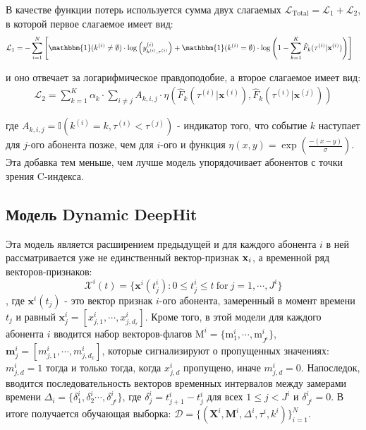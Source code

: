 \documentclass{article}
\begin{document}
В качестве функции потерь используется сумма двух слагаемых $\mathcal{L}_{\mathrm{Total}}=\mathcal{L}_1+\mathcal{L}_2$, в которой первое слагаемое имеет вид: 
\begin{equation}
	\begin{aligned}
		\mathcal{L}_{1} & = -\sum_{i=1}^N \left[\mathbbm{1}(k^{(i)}\neq\emptyset)\cdot\log\left(y_{k^{(i)},\tau^{(i)}}^{(i)}\right)  + \mathbbm{1}(k^{(i)}=\emptyset)\cdot\log\left(1-\sum_{k=1}^K\hat{F}_k(\tau^{(i)}|\mathbf{x}^{(i)})\right)\right]
	\end{aligned}
\end{equation}

и оно отвечает за логарифмическое правдоподобие, а второе слагаемое имеет вид: 
\begin{equation}
	\begin{aligned}
\mathcal{L}_2=\sum_{k=1}^K\alpha_k\cdot\sum_{i\neq j}A_{k,i,j}\cdot\eta\left(\hat{F}_k(\tau^{(i)}|\mathbf{x}^{(i)}),\hat{F}_k(\tau^{(i)}|\mathbf{x}^{(j)})\right)
	\end{aligned}
\end{equation}

где $A_{k,i,j} = \mathbb{I}(k^{(i)}=k,\tau^{(i)}<\tau^{(j)})$ - индикатор того, что событие $k$ наступает для $j$-ого абонента позже, чем для $i$-ого и функция
$\eta(x,y)=\exp\left(\frac{-(x-y)}{\sigma}\right)$. Эта добавка тем меньше, чем лучше модель упорядочивает абонентов с точки зрения C-индекса. 



\subsection{Модель Dynamic DeepHit}

Эта модель является расширением предыдущей и для каждого абонента $i$ в ней рассматривается уже не единственный вектор-признак $\bold{x}_i$, а временной ряд векторов-признаков: 
$$\mathcal{X}^i(t)=\{\mathbf{x}^i(t_j^i):0\leq t_j^i\leq t\mathrm{~for~}j=1,\cdots,J^i\}$$, где $\mathbf{x}^i(t_j)$ - это вектор признак $i$-ого абонента, замеренный в момент времени $t_j$ и равный $\mathbf{x}_j^i=[x_{j,1}^{i},\cdots,x_{j,d_{r}}^{i}]$. Кроме того, в этой модели для каждого абонента $i$ вводится набор векторов-флагов $\mathrm{M}^i=\{\mathrm{m}_1^i,\cdots,\mathrm{m}_{J^i}^i\}$, $\mathbf{m}_j^i=[m_{j,1}^i,\cdots,m_{j,d_x}^i]$, которые сигнализируют о пропущенных значениях: $m_{j,d}^{i}=1$ тогда и только тогда, когда $x_{j,d}^{i}$ пропущено, иначе $m_{j,d}^{i}=0$. Напоследок, вводится последовательность векторов временных интервалов между замерами времени $\Delta_i = \{\delta_{1}^{i},\delta_{2}^{i}\cdots,\delta_{J^{i}}^{i}\}$, где $\delta_{j}^{i}=t_{j+1}^{i}-t_{j}^{i}$ для всех $1\leq j<J^{i}$ и $\delta_{J^i}^i=0$. В итоге получается обучающая выборка: $\mathcal{D}=\{(\mathbf{X}^{i},\mathbf{M}^{i},\Delta^{i},\tau^{i},k^{i})\}_{i=1}^{N}$.
\end{document}

